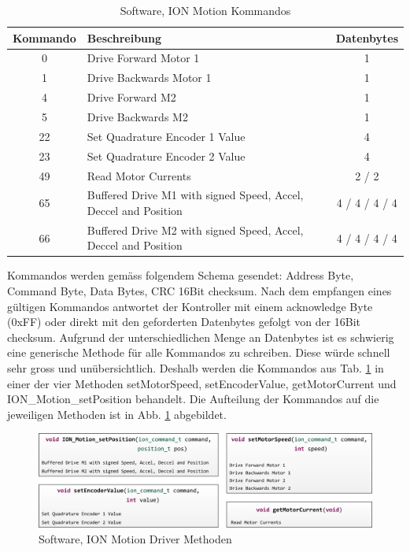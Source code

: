 \begin{table}[H]
	\footnotesize
	\centering
	\caption{Software, ION Motion Kommandos \protect\cite{ION_Motion}}
	\begin{tabular}{|c|l|c|}
		\hline
		\multicolumn{1}{|l|}{\textcolor[rgb]{ .247,  .247,  .247}{\textbf{Kommando}}} & \textcolor[rgb]{ .247,  .247,  .247}{\textbf{Beschreibung}} & \multicolumn{1}{l|}{\textcolor[rgb]{ .247,  .247,  .247}{\textbf{Datenbytes}}} \\
		\hline
		0     & Drive Forward Motor 1 & 1 \\
		\hline
		1     & Drive Backwards Motor 1 & 1 \\
		\hline
		4     & Drive Forward M2 & 1 \\
		\hline
		5     & Drive Backwards M2 & 1 \\
		\hline
		22    & Set Quadrature Encoder 1 Value & 4 \\
		\hline
		23    & Set Quadrature Encoder 2 Value & 4 \\
		\hline
		49    & Read Motor Currents & 2 / 2 \\
		\hline
		65    & Buffered Drive M1 with signed Speed, Accel, Deccel and Position & 4 / 4  / 4 / 4 \\
		\hline
		66    & Buffered Drive M2 with signed Speed, Accel, Deccel and Position & 4 / 4  / 4 / 4 \\
		\hline
	\end{tabular}%
	\label{tab:ION_Kommandos}%
\end{table}%

Kommandos werden gemäss folgendem Schema gesendet: Address Byte, Command Byte, Data Bytes, CRC 16Bit checksum.  Nach dem empfangen eines gültigen Kommandos antwortet der Kontroller mit einem acknowledge Byte (0xFF) oder direkt mit den geforderten Datenbytes gefolgt von der 16Bit checksum. Aufgrund der unterschiedlichen Menge an Datenbytes ist es schwierig eine generische Methode für alle Kommandos zu schreiben. Diese würde schnell sehr gross und unübersichtlich. Deshalb werden die Kommandos aus Tab. \ref{tab:ION_Kommandos} in einer der vier Methoden setMotorSpeed, setEncoderValue, getMotorCurrent und ION\_Motion\_setPosition behandelt. Die Aufteilung der Kommandos auf die jeweiligen Methoden ist in Abb. \ref{fig:ION_Methoden} abgebildet.

\begin{figure}[H]
	\includegraphics[width=1\textwidth]{Illustrationen/6-Umsetzung/ION_Funktionen.png}
	\caption{Software, ION Motion Driver Methoden}
	\label{fig:ION_Methoden}
\end{figure}

